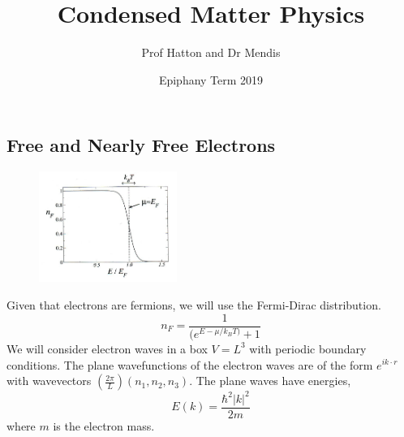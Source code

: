 \documentclass[a4paper, 11pt, normalem]{report}
\title{Condensed Matter Physics \vspace{-20pt}}
\author{Prof Hatton and Dr Mendis}
\date{\vspace{-15pt}Epiphany Term 2019}
\begin{document}
\maketitle
\tableofcontents

\part{}
\chapter{Free and Nearly Free Electrons}
\begin{figure}
    \centering
    \includegraphics[width=0.4\textwidth]{fd.png}
\end{figure}
Given that electrons are fermions, we will use the Fermi-Dirac distribution. 
\begin{equation}
    n_F = \frac{1}{(e^{E-\mu/k_BT)}+1}
\end{equation}
We will consider electron waves in a box $V=L^3$ with periodic boundary conditions. 
The plane wavefunctions of the electron waves are of the form $e^{ik\cdot r}$ with wavevectors $(\frac{2\pi}{L})(n_1,n_2,n_3)$.
The plane waves have energies,
\begin{equation}
    E(k) = \frac{\hbar^2|k|^2}{2m}
\end{equation}
where $m$ is the electron mass. 
\end{document}
